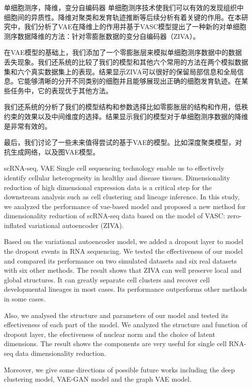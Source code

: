 \begin{中文摘要}{单细胞测序，降维，变分自编码器}
  单细胞测序技术使我们可以有效的发现组织中细胞间的异质性。降维对聚类和发育轨迹推断等后续分析有着关键的作用。在本研究中，我们分析了VAE在降维上的作用并基于VASC模型提出了一种新的对单细胞测序数据降维的方法：针对零膨胀数据的变分自编码器（ZIVA）。
  
  在VAE模型的基础上，我们添加了一个零膨胀层来模拟单细胞测序数据中的数据丢失现象。我们还系统的比较了我们的模型和其他六个常用的方法在两个模拟数据集和六个真实数据集上的表现。结果显示ZIVA可以很好的保留局部信息和全局信息。它能够清晰的分开不同类别的细胞并且能够展现出正确的细胞发育轨迹。在某些任务中，它的表现优于其他方法。
  
  我们还系统的分析了我们的模型结构和参数选择比如零膨胀层的结构和作用，低秩约束的效果以及中间维度的选择。结果显示我们的模型对于单细胞测序数据的降维是非常有效的。
  
  最后，我们讨论了一些未来值得尝试的基于VAE的模型。比如深度聚类模型，对抗生成网络，以及图VAE模型。
\end{中文摘要}

\begin{英文摘要}{scRNA-seq, VAE}
  Single cell sequencing technology enable us to effectively identify cellular heterogeneity in healthy and disease tissues. Dimensionality reduction of high dimensional expression data is a critical step for the downstream analysis such as cell clustering and lineage inference. In this study, we analyzed the performance of vae-based model and proposed a new method for dimensionality reduction of scRNA-seq data based on the model of VASC: zero-inflated variational autoencoder (ZIVA).
  
  Based on the variational autoencoder model, we added a dropout layer to model the dropout events in RNA sequencing. We tested the effectiveness of our model and compared its performance on two simulated datasets and six real datasets with six other methods. The result shows that ZIVA can well preserve local and global structures. It can greatly separate cell clusters and recover cell developmental lineages in most cases. Its performance outperforms other methods in some cases. 
  
  Also, we analysed the structure and parameters of our model and tested its effectiveness of each part of the model. We analyzed the structure and function of dropout layer, the efectiveness of nuclear norm and the choice of latent dimensions. The result shows the components are very useful for single cell RNA-seq data dimensionality reduction.
  
  Moreover, we give some directions of possible future works including the deep clustering model, VAE-GAN model and the graph VAE model.
\end{英文摘要}
